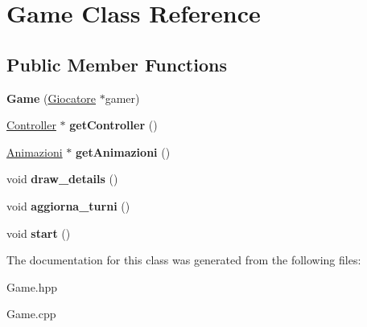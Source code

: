 \hypertarget{classGame}{}\section{Game Class Reference}
\label{classGame}
\subsection*{Public Member Functions}
\begin{DoxyCompactItemize}
\item 
\hypertarget{classGame_aae5e55d577a93b1f8428c7e3da67556b}{}{\bfseries Game} (\hyperlink{classGiocatore}{Giocatore} $\ast$gamer)\label{classGame_aae5e55d577a93b1f8428c7e3da67556b}

\item 
\hypertarget{classGame_abdfaff95e8b4c780a2354f5e43791c50}{}\hyperlink{structController}{Controller} $\ast$ {\bfseries get\+Controller} ()\label{classGame_abdfaff95e8b4c780a2354f5e43791c50}

\item 
\hypertarget{classGame_aa7f7f85608835ceea8720d798e483dee}{}\hyperlink{classAnimazioni}{Animazioni} $\ast$ {\bfseries get\+Animazioni} ()\label{classGame_aa7f7f85608835ceea8720d798e483dee}

\item 
\hypertarget{classGame_ad640d42e1d6a92ba8d0da9aa3aca941f}{}void {\bfseries draw\+\_\+details} ()\label{classGame_ad640d42e1d6a92ba8d0da9aa3aca941f}

\item 
\hypertarget{classGame_a06fb0be2666888d7ff35fa5793d29867}{}void {\bfseries aggiorna\+\_\+turni} ()\label{classGame_a06fb0be2666888d7ff35fa5793d29867}

\item 
\hypertarget{classGame_a3d9b98f7c4a96ecf578f75b96c9f0e90}{}void {\bfseries start} ()\label{classGame_a3d9b98f7c4a96ecf578f75b96c9f0e90}

\end{DoxyCompactItemize}


The documentation for this class was generated from the following files\+:\begin{DoxyCompactItemize}
\item 
Game.\+hpp\item 
Game.\+cpp\end{DoxyCompactItemize}
